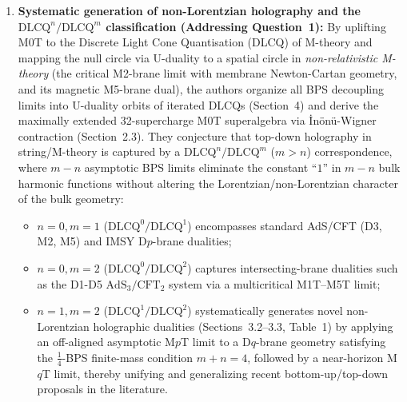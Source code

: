 \documentclass[11pt,a4paper]{article}
\begin{document}
\begin{enumerate}[label=(\alph*), leftmargin=1.8em]
    \item \textbf{Systematic generation of non-Lorentzian holography and the $\text{DLCQ}^n/\text{DLCQ}^m$ classification (Addressing Question~1):}
    By uplifting M0T to the Discrete Light Cone Quantisation (DLCQ) of M-theory and mapping the null circle via U-duality to a spatial circle in \emph{non-relativistic M-theory} (the critical M2-brane limit with membrane Newton-Cartan geometry, and its magnetic M5-brane dual), the authors organize all BPS decoupling limits into U-duality orbits of iterated DLCQs (Section~4) and derive the maximally extended 32-supercharge M0T superalgebra via İnönü-Wigner contraction (Section~2.3). They conjecture that top-down holography in string/M-theory is captured by a $\text{DLCQ}^n/\text{DLCQ}^m$ ($m > n$) correspondence, where $m-n$ asymptotic BPS limits eliminate the constant ``$1$'' in $m-n$ bulk harmonic functions without altering the Lorentzian/non-Lorentzian character of the bulk geometry:
    \begin{itemize}[nosep]
        \item $n=0, m=1$ ($\text{DLCQ}^0/\text{DLCQ}^1$) encompasses standard AdS/CFT (D3, M2, M5) and IMSY D$p$-brane dualities;
        \item $n=0, m=2$ ($\text{DLCQ}^0/\text{DLCQ}^2$) captures intersecting-brane dualities such as the D1-D5 $\text{AdS}_3/\text{CFT}_2$ system via a multicritical M1T--M5T limit;
        \item $n=1, m=2$ ($\text{DLCQ}^1/\text{DLCQ}^2$) systematically generates novel non-Lorentzian holographic dualities (Sections~3.2--3.3, Table~1) by applying an off-aligned asymptotic M$p$T limit to a D$q$-brane geometry satisfying the $\frac{1}{4}$-BPS finite-mass condition $m+n=4$, followed by a near-horizon M$q$T limit, thereby unifying and generalizing recent bottom-up/top-down proposals in the literature.
    \end{itemize}


\end{enumerate}
\end{document}
